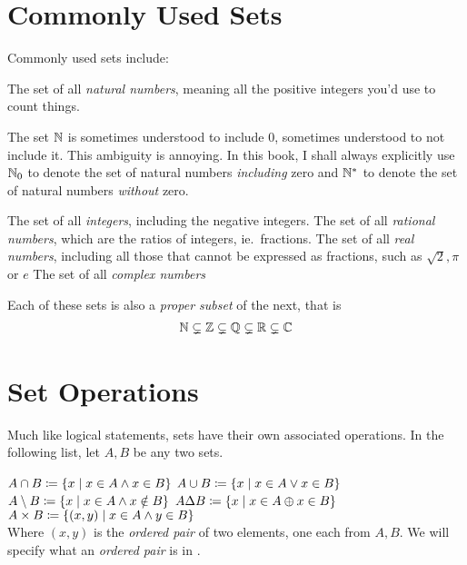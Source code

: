 \section{Commonly Used Sets}
Commonly used sets include:
\begin{itemize}
  \ii{\(\NN\):} The set of all \emph{natural numbers}, meaning all the positive integers
        you'd use to count things.
\begin{remark}
  The set \(\NN\) is sometimes understood to include \(0\), sometimes understood
  to not include it. This ambiguity is annoying.
  In this book, I shall always explicitly use \(\mathbb{N}_{0}\) to denote the set of
  natural numbers \emph{including} zero and \(\mathbb{N}^{*}\) to denote the set of
  natural numbers \emph{without} zero.
\end{remark}
  \ii{\(\ZZ\):} The set of all \emph{integers}, including the negative integers.
  \ii{\(\QQ\)} The set of all \emph{rational numbers}, which are the ratios of integers,
        ie.\ fractions.
  \ii{\(\RR\):} The set of all \emph{real numbers}, including all those that cannot be
        expressed as fractions, such as \(\sqrt{2}, \pi\) or \(e\)
  \ii{\(\CC\)} The set of all \emph{complex numbers}
\end{itemize}

Each of these sets is also a \emph{proper subset} of the next, that is
\begin{align*}
  \mathbb{N} \subsetneq \mathbb{Z} \subsetneq \mathbb{Q} \subsetneq \mathbb{R} \subsetneq \mathbb{C}
\end{align*}

\section{Set Operations}
Much like logical statements, sets have their own associated operations.
In the following list, let \(A, B\) be any two sets.
\begin{itemize}
        \(A \cap B \coloneqq \{x \mid x \in A \land x \in B\}\)
        \(A \cup B \coloneqq \{x \mid x \in A \lor x \in B\}\)
        \(A \setminus B \coloneqq \{x \mid x \in A \land x \notin B\}\)
        \(A \Delta B \coloneqq \{x \mid x \in A \oplus x \in B\}\)
        \(A \times B \coloneqq \{(x, y) \mid x \in A \land y \in B\}\)\\
        Where \((x,y)\) is the \emph{ordered pair} of two elements, one each from \(A, B\).
        We will specify what an \emph{ordered pair} is in .
\end{itemize}

